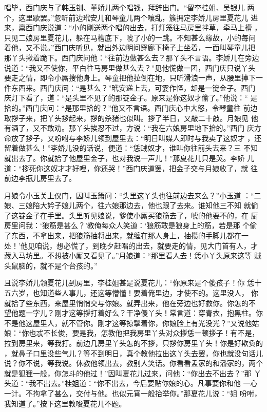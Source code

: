 唱毕，西门庆与了韩玉钏、董娇儿两个唱钱，拜辞出门。“留李桂姐、吴银儿
两个，这里歇罢。”忽听前边玳安儿和琴童儿两个嚷乱，簇拥定李娇儿房里夏花儿
进来，禀西门庆说道：“小的刚送两个唱的出去，打灯笼往马房里拌草，牵马上槽
，只见二娘房里夏花儿，躲在马槽底下，唬了小的一跳。不知甚么缘故，小的每问
着他，又不说。”西门庆听见，就出外边明间穿廊下椅子上坐着，一面叫琴童儿把
那丫头揪着跪下。西门庆问他：“往前边做甚么去？那丫头不言语。李娇儿在旁边
说道：“我又不使你，平白往马房里做甚么去？”见他慌做一团，西门庆只说丫头
要走之情，即令小厮搜他身上。琴童把他拉倒在地，只听滑浪一声，从腰里掉下一
件东西来。西门庆问：“是甚么？”玳安递上去，可霎作怪，却是一锭金子。西门
庆灯下看了，道：“是头里不见了的那锭金子。原来是你这奴才偷了。”他说：“
是拾的。”西门庆问：“是那里拾的？”他又不言语。西门庆心中大怒，令琴童往
前边取拶子来，把丫头拶起来，拶的杀猪也似叫。拶了半日，又敲二十敲。月娘见
他有酒了，又不敢劝。那丫头挨忍不过，方说：“我在六娘房里地下拾的。”西门
庆方命放了拶子，又吩咐与李娇儿领到屋里去：“明日叫媒人即时与我卖了这奴才
，还留着做甚么！”李娇儿没的话说，便道：“恁贼奴才，谁叫你往前头去来？三
不知就出去了。你就拾了他屋里金子，也对我说一声儿！”那夏花儿只是哭。李娇
儿道：“拶死你这奴才才好哩，你还哭！”西门庆道罢，把金子交与月娘收了，就
往前边李瓶儿房里去了。

月娘令小玉关上仪门，因叫玉箫问：“头里这丫头也往前边去来么？”小玉道
：“二娘、三娘陪大妗子娘儿两个，往六娘那边去，他也跟了去来。谁知他三不知
就偷了这锭金子在手里。头里听见娘说，爹使小厮买狼筋去了，唬的他要不的，在
厨房里问我：‘狼筋是甚么？’教俺每众人笑道：‘狼筋敢是狼身上的筋，若是那
个偷了东西，不拿出来，把狼筋抽将出来，就缠在那人身上，抽攒的手脚儿都在一
处！’他见咱说，想必慌了，到晚夕赶唱的出去，就要走的情，见大门首有人，才
藏入马坊里。不想被小厮又看见了。”月娘道：“那里看人去！恁小丫头原来这等
贼头鼠脑的，就不是个台孩的。”

且说李娇儿领夏花儿到房里，李桂姐甚是说夏花儿：“你原来是个傻孩子！你
恁十五六岁，也知道些人事儿，还这等懵懂！要着俺里边，才使不的。这里没人，
你就拾了些东西，来屋里悄悄交与你娘。就弄出来，他在旁边也好救你。你怎的不
望他题一字儿？刚才这等拶打着好么？干净傻丫头！常言道：穿青衣，抱黑柱。你
不是他这屋里人，就不管你。刚才这等掠掣着你，你娘脸上有光没光？”又说他姑
娘：“你也忒不长俊，要是我，怎教他把我房里丫头对众拶恁一顿拶子！有不是，
拉到房里来，等我打。前边几房里丫头怎的不拶，只拶你房里丫头！你是好欺负的
，就鼻子口里没些气儿？等不到明日，真个教他拉出这丫头去罢，你也就没句话儿
说？你不说，等我说。休教他领出去，教别人笑话。你看看孟家的和潘家的，两个
就是狐狸一般，你怎斗的他过！”因叫夏花儿过来，问他：“你出去不出去？”那
丫头道：“我不出去。”桂姐道：“你不出去，今后要贴你娘的心。凡事要你和他
一心一计。不拘拿了甚么，交付与他。也似元宵一般抬举你。”那夏花儿说：“姐
吩咐，我知道了。”按下这里教唆夏花儿不题。

